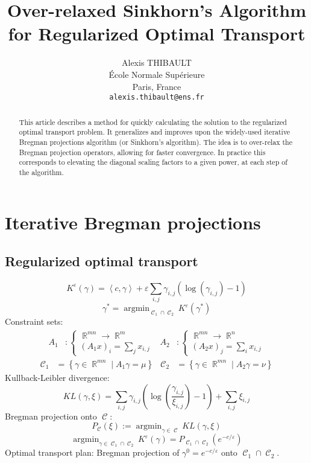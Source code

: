 \documentclass{article} %
\title{Over-relaxed Sinkhorn's Algorithm for Regularized Optimal Transport}
\author{
Alexis THIBAULT\\
\'Ecole Normale Sup\'erieure\\
Paris, France\\
\texttt{alexis.thibault@ens.fr}
}
\newcommand{\scal}[2]{\left\langle #1 , #2 \right\rangle}
\DeclareMathOperator{\IR}{\mathbb{R}}
\DeclareMathOperator*{\argmin}{argmin}
\DeclareMathOperator{\Ccal}{\mathcal{C}}
\renewcommand{\epsilon}{\varepsilon}
\theoremstyle{plain}
\theoremstyle{definition}
\theoremstyle{remark}
\begin{document}
\maketitle

\begin{abstract}
This article describes a method for quickly calculating the solution to the regularized optimal transport problem. It generalizes and improves upon the widely-used iterative Bregman projections algorithm (or Sinkhorn's algorithm). The idea is to over-relax the Bregman projection operators, allowing for faster convergence. In practice this corresponds to elevating the diagonal scaling factors to a given power, at each step of the algorithm.
\end{abstract}

\section{Iterative Bregman projections}

\subsection{Regularized optimal transport}

\[
K^\epsilon(\gamma) = \scal{c}{\gamma}
+ \epsilon \sum_{i,j} \gamma_{i,j} (\log(\gamma_{i,j}) - 1)
\]
\begin{equation}\label{eq:reg_ot_pb}
\gamma^* = \argmin_{\Ccal_1 \cap \Ccal_2} K^\epsilon(\gamma^*)
\end{equation}
Constraint sets:
\begin{align*}
A_1 &: \begin{cases}
\IR^{mn} \rightarrow \IR^m \\
(A_1 x)_i = \sum_j x_{i,j}
\end{cases} &
A_2 &: \begin{cases}
\IR^{mn} \rightarrow \IR^n\\
(A_2 x)_j = \sum_i x_{i,j}
\end{cases}
\end{align*}
\begin{align*}
\Ccal_1 &= \left\{ \gamma\in\IR^{mn} \mid A_1 \gamma = \mu \right\} &
\Ccal_2 &= \left\{ \gamma\in\IR^{mn} \mid A_2 \gamma = \nu \right\}
\end{align*}
Kullback-Leibler divergence:
\[ 
KL(\gamma,\xi) = \sum_{i,j} \gamma_{i,j} \left( \log \left( \frac{\gamma_{i,j}}{\xi_{i,j}} \right) -1  \right) + \sum_{i,j} \xi_{i,j}
\]
Bregman projection onto $\Ccal$:
\[
P_{\Ccal}(\xi) := \argmin_{\gamma \in \Ccal} KL(\gamma,\xi)
\]
\[\argmin_{\gamma \in \Ccal_1 \cap \Ccal_2} K^\epsilon(\gamma) = P_{\Ccal_1 \cap \Ccal_2} (e^{-c/\epsilon})\]
Optimal transport plan: Bregman projection of $\gamma^0 = e^{-c/\epsilon}$ onto $\Ccal_1 \cap \Ccal_2$.
\end{document}

